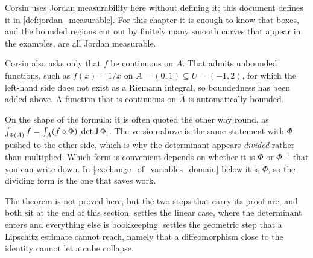 \begin{ainote}
Corsin uses Jordan measurability here without defining it; this document defines it in
\cref{def:jordan_measurable}. For this chapter it is enough to know that boxes, and the bounded
regions cut out by finitely many smooth curves that appear in the examples, are all Jordan
measurable.

Corsin also asks only that $f$ be continuous on $A$. That admits unbounded functions, such as
$f(x) = 1/x$ on $A = (0,1) \subseteq U = (-1,2)$, for which the left-hand side does not exist as a
Riemann integral, so boundedness has been added above. A function that is continuous on
$\overline{A}$ is automatically bounded.

On the shape of the formula: it is often quoted the other way round, as
$\int_{\Phi(A)} f = \int_A (f\circ\Phi)\,\lvert\det\operatorname{J}\Phi\rvert$. The version above is the same
statement with $\Phi$ pushed to the other side, which is why the determinant appears
\emph{divided} rather than multiplied. Which form is convenient depends on whether it is $\Phi$
or $\Phi^{-1}$ that you can write down. In \cref{ex:change_of_variables_domain} below it is
$\Phi$, so the dividing form is the one that saves work.

The theorem is not proved here, but the two steps that carry its proof are, and both sit at the
end of this section.  settles the linear case,
where the determinant enters and everything else is bookkeeping.
 settles the geometric step that a Lipschitz estimate
cannot reach, namely that a diffeomorphism close to the identity cannot let a cube collapse.
\end{ainote}

